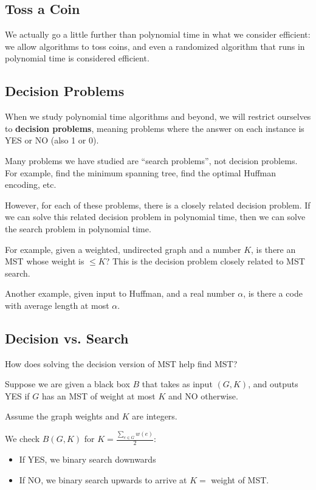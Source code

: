 \subsection{Toss a Coin}
We actually go a little further than polynomial time in what we consider efficient: we allow algorithms to toss coins, and even a randomized algorithm that runs in polynomial time is considered efficient.

\subsection{Decision Problems}
When we study polynomial time algorithms and beyond, we will restrict ourselves to \textbf{decision problems}, meaning problems where the answer on each instance is YES or NO (also 1 or 0).

Many problems we have studied are ``search problems'', not decision problems. For example, find the minimum spanning tree, find the optimal Huffman encoding, etc.

However, for each of these problems, there is a closely related decision problem. If we can solve this related decision problem in polynomial time, then we can solve the search problem in polynomial time.

For example, given a weighted, undirected graph and a number $K$, is there an MST whose weight is $\le K$? This is the decision problem closely related to MST search.

Another example, given input to Huffman, and a real number $\alpha$, is there a code with average length at most $\alpha$.

\subsection{Decision vs. Search}
How does solving the decision version of MST help find MST?

Suppose we are given a black box $B$ that takes as input $(G, K)$, and outputs YES if $G$ has an MST of weight at most $K$ and NO otherwise.

Assume the graph weights and $K$ are integers.

We check $B(G, K)$ for $K = \frac{\sum_{e \in G} w(e)}{2}$:
\begin{itemize}
	\item If YES, we binary search downwards
	\item If NO, we binary search upwards to arrive at $K = $  weight of MST.
\end{itemize}

